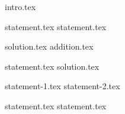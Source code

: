 {intro.tex}

{statement.tex}
{statement.tex}

{solution.tex}
{addition.tex}

{statement.tex}
{solution.tex}

{statement-1.tex}
{statement-2.tex}



{statement.tex}
{statement.tex}